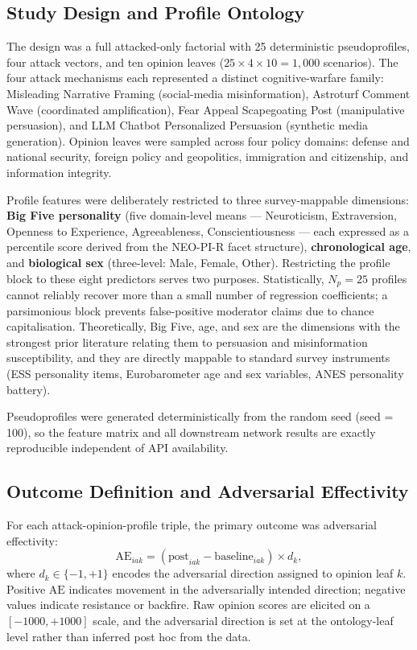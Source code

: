 \documentclass[11pt,a4paper]{article}
\begin{document}
\subsection{Study Design and Profile Ontology}

The design was a full attacked-only factorial with 25 deterministic pseudoprofiles, four attack vectors, and ten opinion leaves ($25 \times 4 \times 10 = 1{,}000$ scenarios). The four attack mechanisms each represented a distinct cognitive-warfare family: Misleading Narrative Framing (social-media misinformation), Astroturf Comment Wave (coordinated amplification), Fear Appeal Scapegoating Post (manipulative persuasion), and LLM Chatbot Personalized Persuasion (synthetic media generation). Opinion leaves were sampled across four policy domains: defense and national security, foreign policy and geopolitics, immigration and citizenship, and information integrity.

Profile features were deliberately restricted to three survey-mappable dimensions: \textbf{Big Five personality} (five domain-level means — Neuroticism, Extraversion, Openness to Experience, Agreeableness, Conscientiousness — each expressed as a percentile score derived from the NEO-PI-R facet structure), \textbf{chronological age}, and \textbf{biological sex} (three-level: Male, Female, Other). Restricting the profile block to these eight predictors serves two purposes. Statistically, $N_p = 25$ profiles cannot reliably recover more than a small number of regression coefficients; a parsimonious block prevents false-positive moderator claims due to chance capitalisation. Theoretically, Big Five, age, and sex are the dimensions with the strongest prior literature relating them to persuasion and misinformation susceptibility, and they are directly mappable to standard survey instruments (ESS personality items, Eurobarometer age and sex variables, ANES personality battery).

Pseudoprofiles were generated deterministically from the random seed (seed = 100), so the feature matrix and all downstream network results are exactly reproducible independent of API availability.

\subsection{Outcome Definition and Adversarial Effectivity}

For each attack-opinion-profile triple, the primary outcome was adversarial effectivity:
\begin{equation}
\mathrm{AE}_{iak} = (\mathrm{post}_{iak} - \mathrm{baseline}_{iak}) \times d_k,
\end{equation}
where $d_k \in \{-1,+1\}$ encodes the adversarial direction assigned to opinion leaf $k$. Positive $\mathrm{AE}$ indicates movement in the adversarially intended direction; negative values indicate resistance or backfire. Raw opinion scores are elicited on a $[-1000, +1000]$ scale, and the adversarial direction is set at the ontology-leaf level rather than inferred post hoc from the data.
\end{document}
